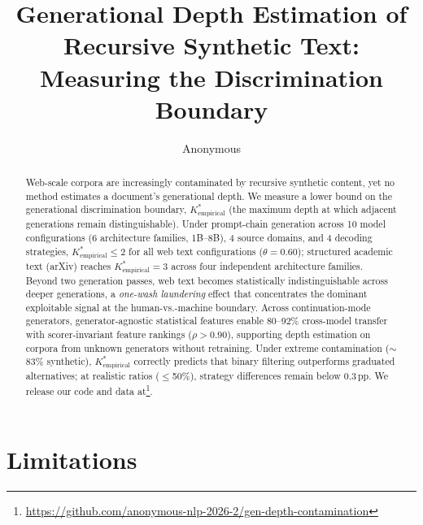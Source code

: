 \documentclass[11pt]{article}
\title{Generational Depth Estimation of Recursive Synthetic Text:\\Measuring the Discrimination Boundary}
\author{Anonymous}
\newcommand{\Kempirical}{{K^*_{\text{empirical}}}}
\begin{document}
\maketitle

\begin{abstract}
Web-scale corpora are increasingly contaminated by recursive synthetic content, yet no method estimates a document's generational depth.
We measure a lower bound on the generational discrimination boundary, $\Kempirical$ (the maximum depth at which adjacent generations remain distinguishable).
Under prompt-chain generation across 10 model configurations (6 architecture families, 1B--8B), 4 source domains, and 4 decoding strategies, $\Kempirical \leq 2$ for all web text configurations ($\theta{=}0.60$); structured academic text (arXiv) reaches $\Kempirical{=}3$ across four independent architecture families.
Beyond two generation passes, web text becomes statistically indistinguishable across deeper generations, a \emph{one-wash laundering} effect that concentrates the dominant exploitable signal at the human-vs.-machine boundary.
Across continuation-mode generators, generator-agnostic statistical features enable 80--92\% cross-model transfer with scorer-invariant feature rankings ($\rho > 0.90$), supporting depth estimation on corpora from unknown generators without retraining.
Under extreme contamination (${\sim}$83\% synthetic), $\Kempirical$ correctly predicts that binary filtering outperforms graduated alternatives; at realistic ratios ($\leq$50\%), strategy differences remain below 0.3\,pp.
We release our code and data at\footnote{\url{https://github.com/anonymous-nlp-2026-2/gen-depth-contamination}}.
\end{abstract}















\newpage
\section*{Limitations}
\end{document}
